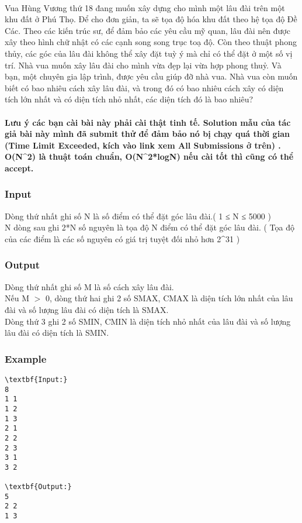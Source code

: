 

 

Vua Hùng Vương thứ 18 đang muốn xây dựng cho mình một lâu đài trên một khu đất ở Phú Thọ. Để cho đơn giản, ta sẽ tọa độ hóa khu đất theo hệ tọa độ Đề Các. Theo các kiến trúc sư, để đảm bảo các yêu cầu mỹ quan, lâu đài nên được xây theo hình chữ nhật có các cạnh song song trục toạ độ. Còn theo thuật phong thủy, các góc của lâu đài không thể xây đặt tuỳ ý mà chỉ có thể đặt ở một số vị trí. Nhà vua muốn xây lâu đài cho mình vừa đẹp lại vừa hợp phong thuỷ. Và bạn, một chuyên gia lập trình, được yêu cầu giúp đỡ nhà vua. Nhà vua còn muốn biết có bao nhiêu cách xây lâu đài, và trong đó có bao nhiêu cách xây có diện tích lớn nhất và có diện tích nhỏ nhất, các diện tích đó là bao nhiêu?

\paragraph{Lưu ý các bạn cài bài này phải cài thật tinh tế. Solution mẫu của tác giả bài này mình đã submit thử để đảm bảo nó bị chạy quá thời gian (Time Limit Exceeded, kích vào link xem All Submissions ở trên) . O(N\textasciicircum2) là thuật toán chuẩn, O(N\textasciicircum2*logN) nếu cài tốt thì cũng có thể accept.}

\subsubsection{Input}

Dòng thứ nhất ghi số N là số điểm có thể đặt góc lâu đài.( 1 ≤ N ≤ 5000 )
\\N dòng sau ghi 2*N số nguyên là tọa độ N điểm có thể đặt góc lâu đài. ( Tọa độ của các điểm là các số nguyên có giá trị tuyệt đối nhỏ hơn 2\textasciicircum31 )

\subsubsection{Output}

Dòng thứ nhất ghi số M là số cách xây lâu đài.
\\Nếu M $>$ 0, dòng thứ hai ghi 2 số SMAX, CMAX là diện tích lớn nhất của lâu đài và số lượng lâu đài có diện tích là SMAX.
\\Dòng thứ 3 ghi 2 số SMIN, CMIN là diện tích nhỏ nhất của lâu đài và số lượng lâu đài có diện tích là SMIN.

\subsubsection{Example}
\begin{verbatim}
\textbf{Input:}
8
1 1
1 2
1 3
2 1
2 2
2 3
3 1
3 2

\textbf{Output:}
5
2 2
1 3

\end{verbatim}
